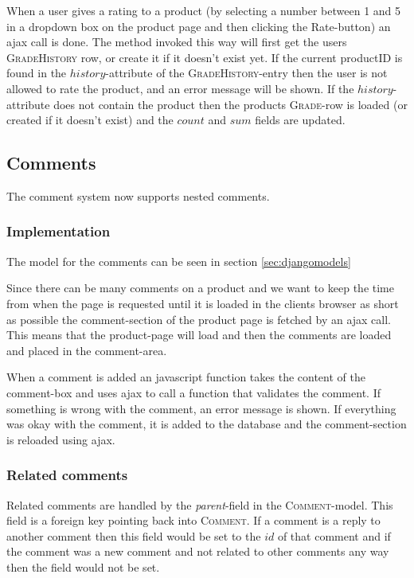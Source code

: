 \documentclass[12pt, a4paper,titlepage]{article}
\begin{document}
When a user gives a rating to a product (by selecting a number between 1 and 5
in a dropdown box on the product page and then clicking the Rate-button) 
an ajax call is done. The method invoked this way will first get the users
\textsc{GradeHistory} row, or create it if it doesn't exist yet.
If the current productID is found in the $history$-attribute of the
\textsc{GradeHistory}-entry then the user is not allowed to rate the product,
and an error message will be shown. If the $history$-attribute does not contain
the product then the products \textsc{Grade}-row is loaded (or created if 
it doesn't exist) and the $count$ and $sum$ fields are updated.

\subsection{Comments}
The comment system now supports nested comments.

\subsubsection{Implementation}
The model for the comments can be seen in section \ref{sec:djangomodels}

Since there can be many comments on a product and we want to keep the time
from when the page is requested until it is loaded in the clients browser as
short as possible the comment-section of the product page is fetched by an
ajax call. This means that the product-page will load and then the comments
are loaded and placed in the comment-area.

When a comment is added an javascript function takes the content of the
comment-box and uses ajax to call a function that validates the comment.
If something is wrong with the comment, an error message is shown.
If everything was okay with the comment, it is added to the database and the
comment-section is reloaded using ajax.

\subsubsection{Related comments}
\label{sec:related_comments}
Related comments are handled by the \emph{parent}-field in the
\textsc{Comment}-model.
This field is a foreign key pointing back into \textsc{Comment}.
If a comment is a reply to another comment then this field would be set to the
$id$ of that comment and if the comment was a new comment and not related
to other comments any way then the field would not be set.
\end{document}
